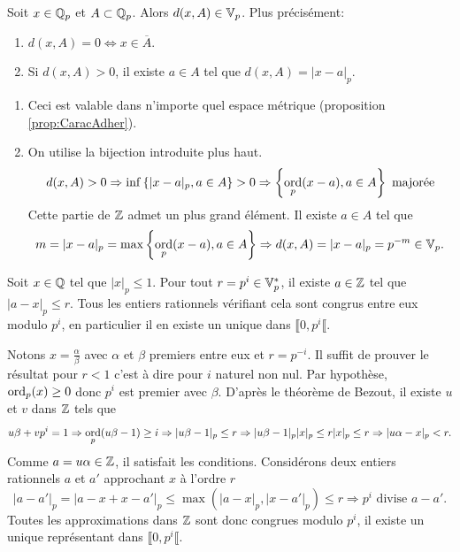 \begin{prop}
 Soit $x \in \mathbb{Q}_p$ et $A \subset \mathbb{Q}_p$. Alors $d(x,A) \in \mathbb{V}_p$. Plus précisément:
 \begin{enumerate}
  \item $d(x,A)=0 \Leftrightarrow x \in \overline{A}$.
  \item Si $d(x,A) > 0$, il existe $a\in A$ tel que $d(x,A) = |x-a|_p$.
 \end{enumerate}
\end{prop}
\begin{demo}
\begin{enumerate}
 \item Ceci est valable dans n'importe quel espace métrique (proposition \ref{prop:CaracAdher}).
 \item On utilise la bijection introduite plus haut.
 \begin{displaymath}
  d(x,A) > 0 \Rightarrow \inf \left\lbrace |x-a|_p, a\in A\right\rbrace > 0
    \Rightarrow \left\lbrace \mathop{\mathrm{ord}}_p(x-a), a\in A\right\rbrace \text{ majorée}
 \end{displaymath}
 Cette partie de $\mathbb{Z}$ admet un plus grand élément. Il existe $a\in A$ tel que
 \begin{displaymath}
  m = |x-a|_p = \max \left\lbrace \mathop{\mathrm{ord}}_p(x-a), a\in A\right\rbrace \Rightarrow d(x,A) = |x-a|_p = p^{-m} \in \mathbb{V}_p.
 \end{displaymath}
\end{enumerate}
\end{demo}

\begin{propn}\label{prop:ReprésentEntierNbPadiq}
Soit $x\in \mathbb{Q}$ tel que $|x|_p \leq 1$. Pour tout $r=p^i\in \mathbb{V}_p^*$, il existe $a \in \mathbb{Z}$ tel que $|a-x|_p \leq r$. Tous les entiers rationnels vérifiant cela sont congrus entre eux modulo $p^i$, en particulier il en existe un unique dans $\llbracket 0, p^i \llbracket$.
\end{propn}
\begin{demo}
 Notons $x=\frac{\alpha}{\beta}$ avec $\alpha$ et $\beta$ premiers entre eux et $r=p^{-i}$. Il suffit de prouver le résultat pour $r<1$ c'est à dire pour $i$ naturel non nul.\newline
 Par hypothèse, $\mathop{\mathrm{ord}}_p(x)\geq 0$ donc $p^i$ est premier avec $\beta$. D'après le théorème de Bezout, il existe $u$ et $v$ dans $\mathbb{Z}$ tels que
\begin{displaymath}
 u\beta + vp^i = 1 \Rightarrow \mathop{\mathrm{ord}}_p(u\beta - 1) \geq i \Rightarrow |u\beta - 1|_p \leq r
 \Rightarrow |u\beta - 1|_p |x|_p \leq r |x|_p \leq r
 \Rightarrow |u\alpha - x|_p < r.
\end{displaymath}
Comme $a = u\alpha \in \mathbb{Z}$, il satisfait les conditions.\newline
Considérons deux entiers rationnels $a$ et $a'$ approchant $x$ à l'ordre $r$
\begin{displaymath}
 |a-a'|_p = |a-x + x-a'|_p \leq \max(|a-x|_p, |x-a'|_p) \leq r
 \Rightarrow p^i \text{ divise } a-a'.
\end{displaymath}
Toutes les approximations dans $\mathbb{Z}$ sont donc congrues modulo $p^i$, il existe un unique représentant dans $\llbracket 0, p^i \llbracket$.
\end{demo}

